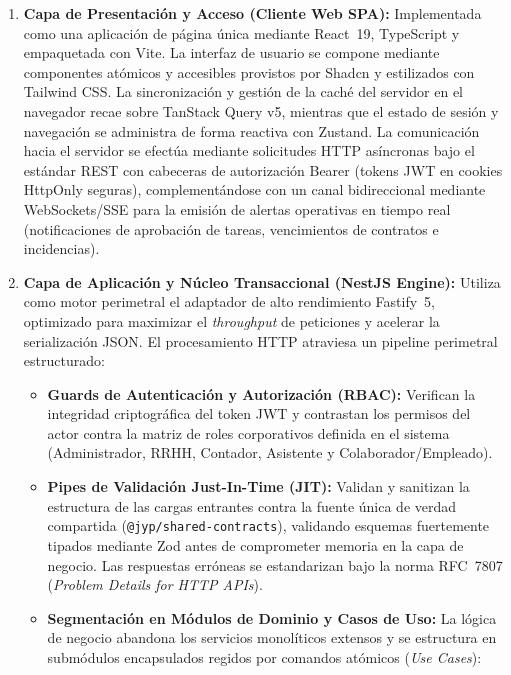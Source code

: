 \begin{enumerate}[leftmargin=*]
    
    \item \textbf{Capa de Presentación y Acceso (Cliente Web SPA):} Implementada como una aplicación de página única mediante React~19, TypeScript y empaquetada con Vite. 
    La interfaz de usuario se compone mediante componentes atómicos y accesibles provistos por Shadcn y estilizados con Tailwind CSS. 
    La sincronización y gestión de la caché del servidor en el navegador recae sobre TanStack Query v5, 
    mientras que el estado de sesión y navegación se administra de forma reactiva con Zustand. 
    La comunicación hacia el servidor se efectúa mediante solicitudes HTTP asíncronas bajo el estándar REST con cabeceras de autorización Bearer (tokens JWT en cookies HttpOnly seguras), 
    complementándose con un canal bidireccional mediante WebSockets/SSE para la emisión de alertas operativas en tiempo real (notificaciones de aprobación de tareas, vencimientos de contratos e incidencias).
    
    \item \textbf{Capa de Aplicación y Núcleo Transaccional (NestJS Engine):} Utiliza como motor perimetral el adaptador de alto rendimiento Fastify~5, 
    optimizado para maximizar el \textit{throughput} de peticiones y acelerar la serialización JSON. 
    El procesamiento HTTP atraviesa un pipeline perimetral estructurado:
    
    \begin{itemize}
        \item \textbf{Guards de Autenticación y Autorización (RBAC):} Verifican la integridad criptográfica del token JWT y 
        contrastan los permisos del actor contra la matriz de roles corporativos definida en el sistema (Administrador, RRHH, Contador, Asistente y Colaborador/Empleado).
        
        \item \textbf{Pipes de Validación Just-In-Time (JIT):} Validan y sanitizan la estructura de las cargas entrantes
         contra la fuente única de verdad compartida (\texttt{@jyp/shared-contracts}), 
         validando esquemas fuertemente tipados mediante Zod antes de comprometer memoria en la capa de negocio. 
         Las respuestas erróneas se estandarizan bajo la norma RFC~7807 (\textit{Problem Details for HTTP APIs}).
        
        \item \textbf{Segmentación en Módulos de Dominio y Casos de Uso:} La lógica de negocio abandona los servicios monolíticos extensos 
        y se estructura en submódulos encapsulados regidos por comandos atómicos (\textit{Use Cases}):
        

\end{itemize}
\end{enumerate}
